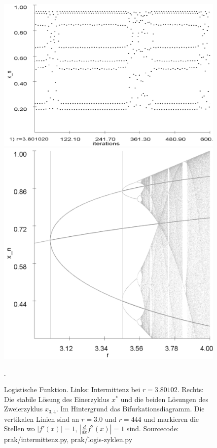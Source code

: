 \documentclass{scrartcl}
\begin{document}
\begin{figure}
\centering
\includegraphics[scale=0.22]{intermittenz}
\includegraphics[scale=0.15]{analy-periodenv}
\caption{Logistische Funktion. Links: Intermittenz bei $r=3.80102$. Rechts: Die stabile Lösung des Einerzyklus $x^*$ und die beiden Lösungen des Zweierzyklus $x_{3,4}$. Im Hintergrund das Bifurkationsdiagramm. Die vertikalen Linien sind an $r=3.0$ und $r=444$ und markieren die Stellen wo $|f'(x)|=1$, $|\frac{d}{dx}f^2(x)|=1$ sind. Sourcecode: prak/intermittenz.py, prak/logis-zyklen.py}. 
\end{figure}
\end{document}
